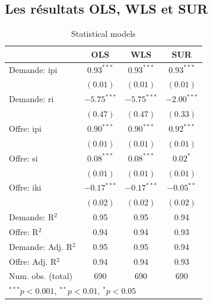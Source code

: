 \documentclass[11pt,]{article}
\begin{document}
\hypertarget{les-resultats-ols-wls-et-sur}{%
\subsection{Les résultats OLS, WLS et
SUR}\label{les-resultats-ols-wls-et-sur}}

\FloatBarrier

\begin{table}[!htbp]
\begin{center}
\begin{tabular}{l c c c }
\hline
 & OLS & WLS & SUR \\
\hline
Demande: ipi        & $0.93^{***}$  & $0.93^{***}$  & $0.93^{***}$  \\
                    & $(0.01)$      & $(0.01)$      & $(0.01)$      \\
Demande: ri         & $-5.75^{***}$ & $-5.75^{***}$ & $-2.00^{***}$ \\
                    & $(0.47)$      & $(0.47)$      & $(0.33)$      \\
Offre: ipi          & $0.90^{***}$  & $0.90^{***}$  & $0.92^{***}$  \\
                    & $(0.01)$      & $(0.01)$      & $(0.01)$      \\
Offre: si           & $0.08^{***}$  & $0.08^{***}$  & $0.02^{*}$    \\
                    & $(0.01)$      & $(0.01)$      & $(0.01)$      \\
Offre: iki          & $-0.17^{***}$ & $-0.17^{***}$ & $-0.05^{**}$  \\
                    & $(0.02)$      & $(0.02)$      & $(0.02)$      \\
\hline
Demande: R$^2$      & 0.95          & 0.95          & 0.94          \\
Offre: R$^2$        & 0.94          & 0.94          & 0.93          \\
Demande: Adj. R$^2$ & 0.95          & 0.95          & 0.94          \\
Offre: Adj. R$^2$   & 0.94          & 0.94          & 0.93          \\
Num. obs. (total)   & 690           & 690           & 690           \\
\hline
\multicolumn{4}{l}{\scriptsize{$^{***}p<0.001$, $^{**}p<0.01$, $^*p<0.05$}}
\end{tabular}
\caption{Statistical models}
\label{table : ols, wls and sur}
\end{center}
\end{table}
\end{document}
